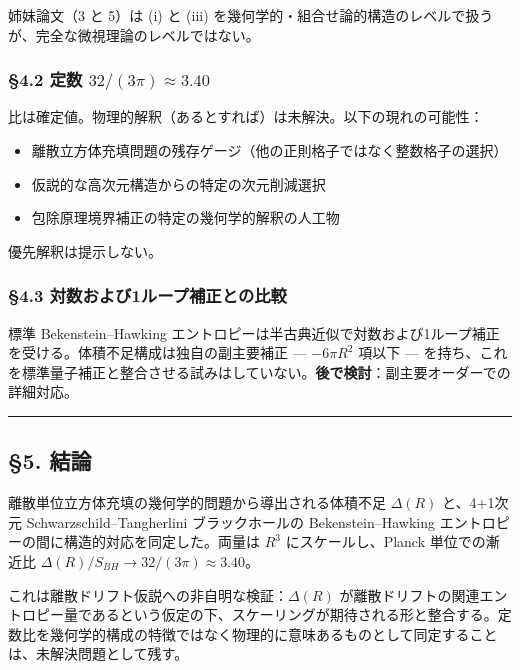 \documentclass[a4paper,11pt]{ltjsarticle}
\theoremstyle{definition}
\providecommand{\tightlist}{\setlength{\itemsep}{0pt}\setlength{\parskip}{0pt}}
\begin{document}
姉妹論文（3 と 5）は (i) と (iii)
を幾何学的・組合せ論的構造のレベルで扱うが、完全な微視理論のレベルではない。

\subsubsection{\texorpdfstring{§4.2 定数
\(32/(3\pi) \approx 3.40\)}{§4.2 定数 32/(3\textbackslash pi) \textbackslash approx 3.40}}\label{ux5b9aux6570-323pi-approx-3.40}

比は確定値。物理的解釈（あるとすれば）は未解決。以下の現れの可能性：

\begin{itemize}
\tightlist
\item
  離散立方体充填問題の残存ゲージ（他の正則格子ではなく整数格子の選択）
\item
  仮説的な高次元構造からの特定の次元削減選択
\item
  包除原理境界補正の特定の幾何学的解釈の人工物
\end{itemize}

優先解釈は提示しない。

\subsubsection{§4.3
対数および1ループ補正との比較}\label{ux5bfeux6570ux304aux3088ux30731ux30ebux30fcux30d7ux88dcux6b63ux3068ux306eux6bd4ux8f03}

標準 Bekenstein--Hawking
エントロピーは半古典近似で対数および1ループ補正を受ける。体積不足構成は独自の副主要補正
--- \(-6\pi R^2\) 項以下 ---
を持ち、これを標準量子補正と整合させる試みはしていない。\textbf{後で検討}：副主要オーダーでの詳細対応。

\begin{center}\rule{0.5\linewidth}{0.5pt}\end{center}

\subsection{§5. 結論}\label{ux7d50ux8ad6}

離散単位立方体充填の幾何学的問題から導出される体積不足 \(\Delta(R)\)
と、4+1次元 Schwarzschild--Tangherlini ブラックホールの
Bekenstein--Hawking エントロピーの間に構造的対応を同定した。両量は
\(R^3\) にスケールし、Planck 単位での漸近比
\(\Delta(R)/S_{BH} \to 32/(3\pi) \approx 3.40\)。

これは離散ドリフト仮説への非自明な検証：\(\Delta(R)\)
が離散ドリフトの関連エントロピー量であるという仮定の下、スケーリングが期待される形と整合する。定数比を幾何学的構成の特徴ではなく物理的に意味あるものとして同定することは、未解決問題として残す。
\end{document}
